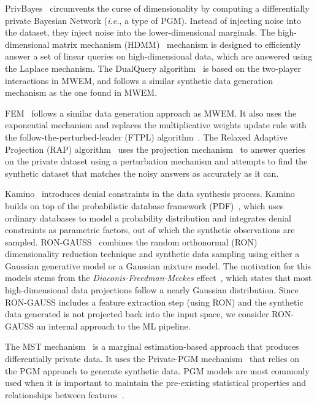 \documentclass[parskip=full]{scrartcl}
\begin{document}
PrivBayes~\cite{zhang2017privbayes} circumvents the curse of dimensionality by
computing a differentially private Bayesian Network (\textit{i.e.}, a type of
PGM). Instead of injecting noise into the dataset, they inject noise into the
lower-dimensional marginals. The high-dimensional matrix mechanism
(HDMM)~\cite{mckenna2018optimizing} mechanism is designed to efficiently
answer a set of linear queries on high-dimensional data, which are answered
using the Laplace mechanism. The DualQuery algorithm~\cite{gaboardi2014dual}
is based on the two-player interactions in MWEM, and follows a similar
synthetic data generation mechanism as the one found in MWEM\@.

FEM~\cite{vietri2020new} follows a similar data generation approach as MWEM\@.
It also uses the exponential mechanism and replaces the multiplicative weights
update rule with the follow-the-perturbed-leader (FTPL)
algorithm~\cite{kalai2005efficient}. The Relaxed Adaptive Projection (RAP)
algorithm~\cite{aydore2021differentially} uses the projection
mechanism~\cite{nikolov2013geometry} to answer queries on the private dataset
using a perturbation mechanism and attempts to find the synthetic dataset that
matches the noisy answers as accurately as it can.

Kamino~\cite{ge2021kamino} introduces denial constraints in the data synthesis
process. Kamino builds on top of the probabilistic database framework
(PDF)~\cite{de2019formal, suciu2011probabilistic}, which uses ordinary
databases to model a probability distribution and integrates denial
constraints as parametric factors, out of which the synthetic observations are
sampled. RON-GAUSS~\cite{chanyaswad2019ron} combines the random orthonormal
(RON) dimensionality reduction technique and synthetic data sampling using
either a Gaussian generative model or a Gaussian mixture model. The motivation
for this models stems from the \textit{Diaconis-Freedman-Meckes}
effect~\cite{meckes2012projections}, which states that most high-dimensional
data projections follow a nearly Gaussian distribution. Since RON-GAUSS
includes a feature extraction step (using RON) and the synthetic data
generated is not projected back into the input space, we consider RON-GAUSS an
internal approach to the ML pipeline.

The MST mechanism~\cite{mckenna2021winning} is a marginal estimation-based
approach that produces differentially private data. It uses the Private-PGM
mechanism~\cite{mckenna2019graphical} that relies on the PGM approach to
generate synthetic data. PGM models are most commonly used when it is
important to maintain the pre-existing statistical properties and
relationships between features~\cite{young2009using}.
\end{document}
